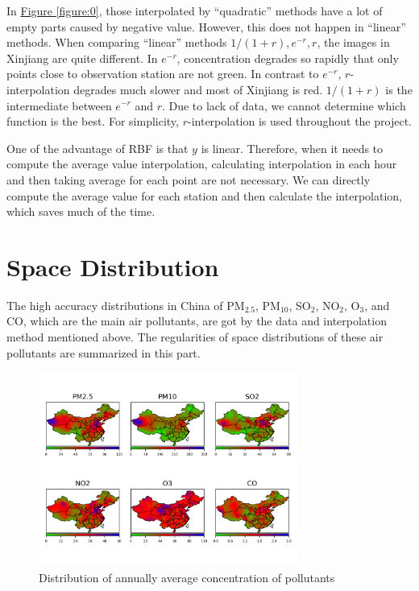 \documentclass[letterpaper]{article}
\begin{document}
In \hyperref[figure:0]{Figure \ref*{figure:0}}, those interpolated by ``quadratic'' methods have a lot of empty parts caused by negative value. However, this does not happen in ``linear'' methods. When comparing ``linear'' methods $1/(1+r), e^{-r}, r$, the images in Xinjiang are quite different. In $e^{-r}$, concentration degrades so rapidly that only points close to observation station are not green. In contrast to $e^{-r}$, $r$-interpolation degrades much slower and most of Xinjiang is red. $1/(1+r)$ is the intermediate between $e^{-r}$ and $r$. Due to lack of data, we cannot determine which function is the best. For simplicity, $r$-interpolation is used throughout the project. 

 One of the advantage of RBF is that $y$ is linear. Therefore, when it needs to compute the average value interpolation, calculating interpolation in each hour and then taking average for each point are not necessary. We can directly compute the average value for each station and then calculate the interpolation, which saves much of the time.

\section{Space Distribution}

The high accuracy distributions in China of PM$_{2.5}$, PM$_{10}$, SO$_{2}$, NO$_{2}$, O$_{3}$, and CO, which are the main air pollutants, are got by the data and interpolation method mentioned above. The regularities of space distributions of these air pollutants are summarized in this part.
\begin{figure}[h]
  \includegraphics[width = 8.5cm]{Interpolation_from_20150102_to_20151231_linear.png}
  \caption{Distribution of annually average concentration of pollutants}
  \label{figure:1}
  \centering
\end{figure}
\end{document}
